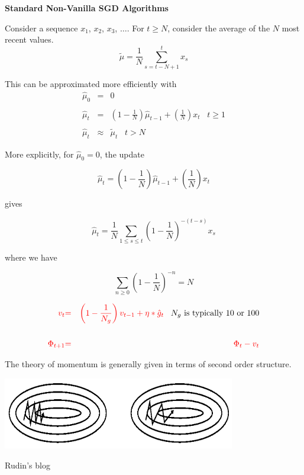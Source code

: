 {\slide{}
\centerline{\bf Standard Non-Vanilla SGD Algorithms}
\vfill
\vfill

Consider a sequence $x_1$, $x_2$, $x_3$, $\ldots$.
\vfill
For $t \geq N$, consider the average of the $N$ most recent values.
$$\tilde{\mu} = \frac{1}{N} \sum_{s=t-N+1}^t x_s$$

\vfill
This can be approximated more efficiently with
\begin{eqnarray*}
\hat{\mu}_0 & = & 0 \\
\\
\hat{\mu}_t & = & \left(1-\frac{1}{N}\right)\hat{\mu}_{t-1} + \left(\frac{1}{N}\right)x_t\;\;\;t \geq 1 \\
\\
\hat{\mu}_t & \approx & \tilde{\mu}_t \;\;\; t >N
\end{eqnarray*}


More explicitly, for $\hat{\mu}_0 = 0$, the update

$$\hat{\mu}_t = \left(1-\frac{1}{N}\right)\hat{\mu}_{t-1} + \left(\frac{1}{N}\right)x_t$$

\vfill
gives

$$\hat{\mu}_t = \frac{1}{N} \sum_{1 \leq s \leq t} \left(1-\frac{1}{N}\right)^{-(t-s)} x_s$$

\vfill
where we have

$$\sum_{n\geq 0} \left(1-\frac{1}{N}\right)^{-n} = N$$


\begin{eqnarray*}
  {\color{red} v_t} & {\color{red} =} & {\color{red} \left(1-\frac{1}{N_g}\right) v_{t-1} + \eta * \hat{g}_t} \;\;\;\mbox{$N_g$ is typically 10 or 100}\\
  \\
  {\color{red} \Phi_{t+1}} & {\color{red} =} & {\color{red} \Phi_t -  v_t} \\
\end{eqnarray*}

The theory of momentum is generally given in terms of second order structure.


\centerline{\includegraphics[width = 4in]{../images/momentum}}
\centerline{\Large Rudin's blog}

}
